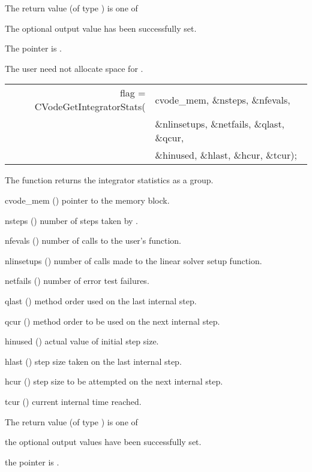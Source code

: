 {
  The return value  (of type ) is one of
  \begin{args}
  \item[\Id{CV\_SUCCESS}] 
    The optional output value has been successfully set.
  \item[\Id{CV\_MEM\_NULL}]
    The  pointer is .
  \end{args}
}
{
  The user need not allocate space for .
}
{
  \begin{tabular}[t]{@{}r@{}l@{}}
    flag = CVodeGetIntegratorStats(&cvode\_mem, \&nsteps, \&nfevals, \\
                                   &\&nlinsetups, \&netfails, \&qlast, \&qcur, \\
                                   &\&hinused, \&hlast, \&hcur, \&tcur);
  \end{tabular}
}
{
  The function  returns the {\cvode} integrator
  statistics as a group.
}
{
  \begin{args}[nlinsetups]
  \item[cvode\_mem] ()
    pointer to the {\cvode} memory block.
  \item[nsteps] ()
    number of steps taken by {\cvode}.
  \item[nfevals] ()
    number of calls to the user's  function.
  \item[nlinsetups] ()
    number of calls made to the linear solver setup function.
  \item[netfails] ()
    number of error test failures.
  \item[qlast] ()
    method order used on the last internal step.
  \item[qcur] ()
    method order to be used on the next internal step.
  \item[hinused] ()
    actual value of initial step size.
  \item[hlast] ()
    step size taken on the last internal step.
  \item[hcur] ()
    step size to be attempted on the next internal step.
  \item[tcur] ()
    current internal time reached.
  \end{args}
}
{
  The return value  (of type ) is one of
  \begin{args}
  \item[\Id{CV\_SUCCESS}] 
    the optional output values have been successfully set.
  \item[\Id{CV\_MEM\_NULL}]
    the  pointer is .
  \end{args}
}
